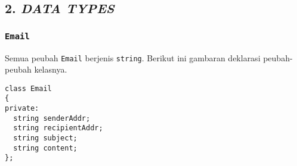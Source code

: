 \subsection*{\textcolor{subsectioncolor}{\textsf{2. \textit{DATA TYPES}}}}

\subsubsection*{\texttt{Email}}
Semua peubah \texttt{Email} berjenis \texttt{string}.
Berikut ini gambaran deklarasi peubah-peubah kelasnya.
\begin{verbatim}
class Email
{
private:
  string senderAddr;
  string recipientAddr;
  string subject;
  string content;
};
\end{verbatim}
